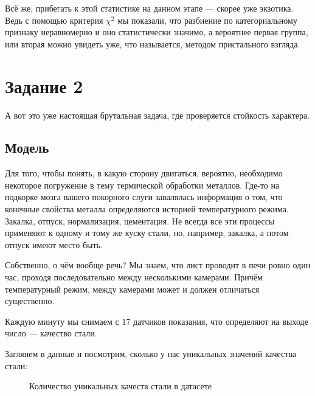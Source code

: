 \documentclass[12pt,a4paper]{report}
\begin{document}
Всё же, прибегать к этой статистике на данном этапе — скорее уже экзотика. Ведь с помощью критерия $\chi^2$ мы показали, что разбиение по категориальному признаку неравномерно и оно статистически значимо, а вероятнее первая группа, или вторая можно увидеть уже, что называется, методом пристального взгляда.

\chapter*{Задание 2}
А вот это уже настоящая брутальная задача, где проверяется стойкость характера.
\section*{Модель}
Для того, чтобы понять, в какую сторону двигаться, вероятно, необходимо некоторое погружение в тему термической обработки металлов. Где-то на подкорке мозга вашего покорного слуги завалялась информация о том, что конечные свойства металла определяются историей температурного режима. Закалка, отпуск, нормализация, цементация. Не всегда все эти процессы применяют к одному и тому же куску стали, но, например, закалка, а потом отпуск имеют место быть.

Собственно, о чём вообще речь? Мы знаем, что лист проводит в печи ровно один час, проходя последовательно между несколькими камерами. Причём температурный режим, между камерами может и должен отличаться существенно.

Каждую минуту мы снимаем с 17 датчиков показания, что определяют на выходе число — качество стали.

Заглянем в данные и посмотрим, сколько у нас уникальных значений качества стали:

\begin{figure}[h]
	\caption{Количество уникальных качеств стали в датасете}
	\label{fig:test}
\end{figure}
\end{document}
